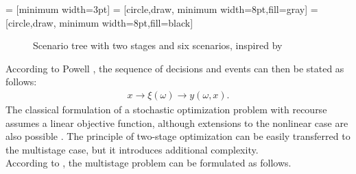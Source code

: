  = [minimum width=3pt]
 = [circle,draw, minimum width=8pt,fill=gray]
 = [circle,draw, minimum width=8pt,fill=black]
\begin{figure}[h]
    \centering
    \caption{Scenario tree with two stages and six scenarios, inspired by \cite{Fuellner_SDDP_TUT, Powell_Clearing_the_Jungle_of_stochastic_Optimization}}
    \label{fig:scenario_tree}
\end{figure}
According to Powell \cite{Powell_solving_Curses_of_Dimensionality}, the sequence of decisions and events can then be stated as follows:
\begin{align*}
    x \rightarrow \xi(\omega) \rightarrow y(\omega,x) .
\end{align*}
The classical formulation of a stochastic optimization problem with recourse assumes a linear objective function, although extensions to the nonlinear case are also possible \cite{BirgeLouveaux}.
The principle of two-stage optimization can be easily transferred to the multistage case, but it introduces additional complexity. \\
According to \cite{Lectures_on_stochastic_Programming_Shapiro_Ruszczynski}, the multistage problem can be formulated as follows.

